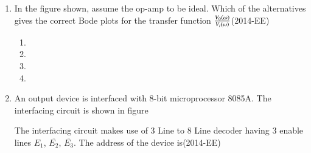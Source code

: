 \documentclass[journal,12pt,twocolumn]{IEEEtran}
\theoremstyle{remark}
\begin{document}
\begin{enumerate}[start=53]
\begin{center}

\end{center}

\begin{enumerate}
\end{enumerate}



\item In the figure shown, assume the op-amp to be ideal. Which of the alternatives gives the correct Bode plots for the transfer function $\frac{V_0 \left(\omega\right)}{V_i\left(\omega\right)}$\hfill{(2014-EE)} 




\begin{enumerate}
   
\item    

\item    


\item  


\item    
\end{enumerate}
\item An output device is interfaced with 8-bit microprocessor 8085A. The interfacing circuit is shown in
figure 


\begin{center}

\end{center}


The interfacing circuit makes use of 3 Line to 8 Line decoder having 3 enable lines $E_1$, $\overline{E_2}$, $\overline{E_3}$. The
address of the device is\hfill{(2014-EE)} 

	\begin{enumerate}


\end{enumerate}
\end{enumerate}
\end{document}
